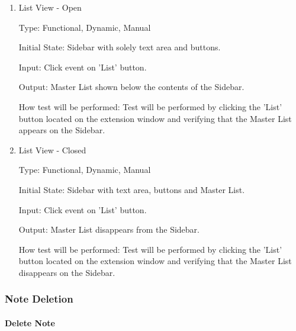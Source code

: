 \documentclass[12pt, titlepage]{article}
\begin{document}
\begin{enumerate}
	
	\item{List View - Open\\}
	
	Type: Functional, Dynamic, Manual
	
	Initial State: Sidebar with solely text area and buttons. 
	
	Input: Click event on 'List' button.
	
	Output: Master List shown below the contents of the Sidebar.
	
	How test will be performed: Test will be performed by clicking the 'List' button located 
	on the extension window and verifying that the Master List appears on the Sidebar. 
	
	\item{List View - Closed\\}
	
	Type: Functional, Dynamic, Manual
	
	Initial State: Sidebar with text area, buttons and Master List. 
	
	Input: Click event on 'List' button.
	
	Output: Master List disappears from the Sidebar.
	
	How test will be performed: Test will be performed by clicking the 'List' button located 
	on the extension window and verifying that the Master List disappears on the Sidebar.  
	
\end{enumerate}

\subsubsection{Note Deletion}

\paragraph{Delete Note}
\end{document}
